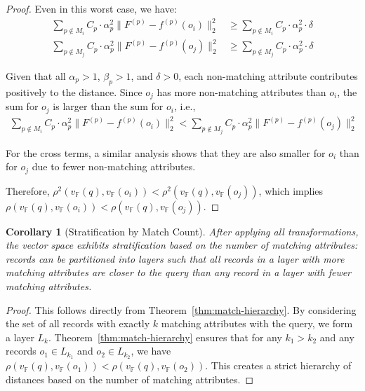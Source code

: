 \documentclass[numbers,sort]{article}
\newtheorem{corollary}{Corollary}
\begin{document}
\begin{proof}
Even in this worst case, we have:
\begin{align}
\sum_{p \notin M_i} C_p \cdot \alpha_p^2 \|F^{(p)} - f^{(p)}(o_i)\|_2^2 &\geq \sum_{p \notin M_i} C_p \cdot \alpha_p^2 \cdot \delta \\
\sum_{p \notin M_j} C_p \cdot \alpha_p^2 \|F^{(p)} - f^{(p)}(o_j)\|_2^2 &\geq \sum_{p \notin M_j} C_p \cdot \alpha_p^2 \cdot \delta
\end{align}

Given that all $\alpha_p > 1$, $\beta_p > 1$, and $\delta > 0$, each non-matching attribute contributes positively to the distance. Since $o_j$ has more non-matching attributes than $o_i$, the sum for $o_j$ is larger than the sum for $o_i$, i.e., 
\begin{align}
\sum_{p \notin M_i} C_p \cdot \alpha_p^2 \|F^{(p)} - f^{(p)}(o_i)\|_2^2 < \sum_{p \notin M_j} C_p \cdot \alpha_p^2 \|F^{(p)} - f^{(p)}(o_j)\|_2^2
\end{align}

For the cross terms, a similar analysis shows that they are also smaller for $o_i$ than for $o_j$ due to fewer non-matching attributes.

Therefore, $\rho^2(v_{\mathbb{F}}(q), v_{\mathbb{F}}(o_i)) < \rho^2(v_{\mathbb{F}}(q), v_{\mathbb{F}}(o_j))$, which implies $\rho(v_{\mathbb{F}}(q), v_{\mathbb{F}}(o_i)) < \rho(v_{\mathbb{F}}(q), v_{\mathbb{F}}(o_j))$.
\end{proof}

\begin{corollary}[Stratification by Match Count]
\label{cor:stratification}
After applying all transformations, the vector space exhibits stratification based on the number of matching attributes: records can be partitioned into layers such that all records in a layer with more matching attributes are closer to the query than any record in a layer with fewer matching attributes.
\end{corollary}

\begin{proof}
This follows directly from Theorem~\ref{thm:match-hierarchy}. By considering the set of all records with exactly $k$ matching attributes with the query, we form a layer $L_k$. Theorem~\ref{thm:match-hierarchy} ensures that for any $k_1 > k_2$ and any records $o_1 \in L_{k_1}$ and $o_2 \in L_{k_2}$, we have $\rho(v_{\mathbb{F}}(q), v_{\mathbb{F}}(o_1)) < \rho(v_{\mathbb{F}}(q), v_{\mathbb{F}}(o_2))$. This creates a strict hierarchy of distances based on the number of matching attributes.
\end{proof}
\end{document}

